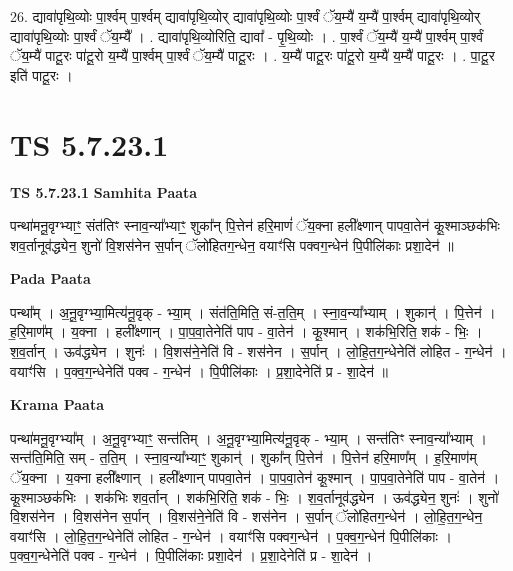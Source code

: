 \documentclass[17pt]{extarticle}
\begin{document}
26. द्यावा॑पृथि॒व्योः पा॒र्श्वम् पा॒र्श्वम् द्यावा॑पृथि॒व्योर् द्यावा॑पृथि॒व्योः पा॒र्श्वं ॅय॒म्यै॑ य॒म्यै॑ पा॒र्श्वम् द्यावा॑पृथि॒व्योर् द्यावा॑पृथि॒व्योः पा॒र्श्वं ॅय॒म्यै᳚ । . द्यावा॑पृथि॒व्योरिति॒ द्यावा᳚ - पृ॒थि॒व्योः । . पा॒र्श्वं ॅय॒म्यै॑ य॒म्यै॑ पा॒र्श्वम् पा॒र्श्वं ॅय॒म्यै॑ पाटू॒रः पा॑टू॒रो य॒म्यै॑ पा॒र्श्वम् पा॒र्श्वं ॅय॒म्यै॑ पाटू॒रः । . य॒म्यै॑ पाटू॒रः पा॑टू॒रो य॒म्यै॑ य॒म्यै॑ पाटू॒रः । . पा॒टू॒र इति॑ पाटू॒रः । \newline
\pagebreak
{}

\section{ TS 5.7.23.1 }

\textbf{TS 5.7.23.1 } \newline
\textbf{Samhita Paata} \newline

पन्था॑मनू॒वृग्भ्याꣳ॒॒ संत॑तिꣳ स्नाव॒न्या᳚भ्याꣳ॒॒ शुका᳚न् पि॒त्तेन॑ हरि॒माणं॑ ॅय॒क्ना हली᳚क्ष्णान् पापवा॒तेन॑ कू॒श्माञ्छक॑भिः शव॒र्तानूव॑द्ध्येन॒ शुनो॑ वि॒शस॑नेन स॒र्पान् ॅलो॑हितग॒न्धेन॒ वयाꣳ॑सि पक्वग॒न्धेन॑ पि॒पीलि॑काः प्रशा॒देन॑ ॥ \newline

\textbf{Pada Paata} \newline

पन्था᳚म् । अ॒नू॒वृग्भ्या॒मित्य॑नू॒वृक् - भ्या॒म् । संत॑ति॒मिति॒ सं-त॒ति॒म् । स्ना॒व॒न्या᳚भ्याम् । शुकान्॑ । पि॒त्तेन॑ । ह॒रि॒माण᳚म् । य॒क्ना । हली᳚क्ष्णान् । पा॒प॒वा॒तेनेति॑ पाप - वा॒तेन॑ । कू॒श्मान् । शक॑भि॒रिति॒ शक॑ - भिः॒ । श॒व॒र्तान् । ऊव॑द्ध्येन । शुनः॑ । वि॒शस॑ने॒नेति॑ वि - शस॑नेन । स॒र्पान् । लो॒हि॒त॒ग॒न्धेनेति॑ लोहित - ग॒न्धेन॑ । वयाꣳ॑सि । प॒क्व॒ग॒न्धेनेति॑ पक्व - ग॒न्धेन॑ । पि॒पीलि॑काः । प्र॒शा॒देनेति॑ प्र - शा॒देन॑ ॥  \newline


\textbf{Krama Paata} \newline

पन्था॑मनू॒वृग्भ्या᳚म् । अ॒नू॒वृग्भ्याꣳ॒॒ सन्त॑तिम् । अ॒नू॒वृग्भ्या॒मित्य॑नू॒वृक् - भ्या॒म् । सन्त॑तिꣳ स्नाव॒न्या᳚भ्याम् । सन्त॑ति॒मिति॒ सम् - त॒ति॒म् । स्ना॒व॒न्या᳚भ्याꣳ॒॒ शुकान्॑ । शुका᳚न् पि॒त्तेन॑ । पि॒त्तेन॑ हरि॒माण᳚म् । ह॒रि॒माण॑म् ॅय॒क्ना । य॒क्ना हली᳚क्ष्णान् । हली᳚क्ष्णान् पापवा॒तेन॑ । पा॒प॒वा॒तेन॑ कू॒श्मान् । पा॒प॒वा॒तेनेति॑ पाप - वा॒तेन॑ । कू॒श्माञ्छक॑भिः । शक॑भिः शव॒र्तान् । शक॑भि॒रिति॒ शक॑ - भिः॒ । श॒व॒र्तानूव॑द्ध्येन । ऊव॑द्ध्येन॒ शुनः॑ । शुनो॑ वि॒शस॑नेन । वि॒शस॑नेन स॒र्पान् । वि॒शस॑ने॒नेति॑ वि - शस॑नेन । स॒र्पान् ॅलो॑हितग॒न्धेन॑ । लो॒हि॒त॒ग॒न्धेन॒ वयाꣳ॑सि । लो॒हि॒त॒ग॒न्धेनेति॑ लोहित - ग॒न्धेन॑ । वयाꣳ॑सि पक्वग॒न्धेन॑ । प॒क्व॒ग॒न्धेन॑ पि॒पीलि॑काः । प॒क्व॒ग॒न्धेनेति॑ पक्व - ग॒न्धेन॑ । पि॒पीलि॑काः प्रशा॒देन॑ । प्र॒शा॒देनेति॑ प्र - शा॒देन॑ । \newline
\end{document}
